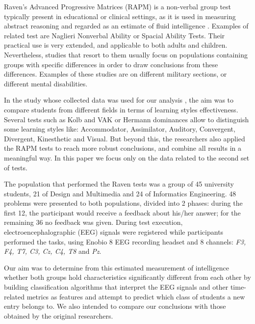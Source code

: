 \documentclass[extendedabs]{recpad2k}
\begin{document}
Raven's Advanced Progressive Matrices (RAPM) is a non-verbal group test typically present in educational or clinical settings, as it is used in measuring 
abstract reasoning and regarded as an estimate of fluid intelligence \cite{rapm}.
Examples of related test are Naglieri Nonverbal Ability or Spacial Ability Tests.
Their practical use is very extended, and applicable to both adults and children.
Nevertheless, studies that resort to them usually focus on populations containing groups with specific differences in order to draw conclusions from these differences.
Examples of these studies are on different military sections, or different mental disabilities.

In the study whose collected data was used for our analysis \cite{study}, the aim was to compare students from different fields in terms of learning styles effectiveness.
Several tests such as Kolb and VAK or Hermann dominances allow to distinguish some learning styles like: Accommodator, Assimilator, Auditory, Convergent,
Divergent, Kinesthetic and Visual.
But beyond this, the researchers also applied the RAPM tests to reach more robust conclusions, and combine all results in a meaningful way.
In this paper we focus only on the data related to the second set of tests.

The population that performed the Raven tests was a group of 45 university students, 21 of Design and Multimedia and 24 of Informatics Engineering.
48 problems were presented to both populations, divided into 2 phases: during the first 12, the participant would receive a feedback about his/her answer; 
for the remaining 36 no feedback was given.
During test execution, electroencephalographic (EEG) signals were registered while participants performed the tasks, using Enobio 8 EEG recording headset and 8 
channels: \textit{F3, F4, T7, C3, Cz, C4, T8} and \textit{Pz}.

Our aim was to determine from this estimated measurement of intelligence whether both groups hold characteristics significantly different from each other by 
building classification algorithms that interpret the EEG signals and other time-related metrics as features and attempt to predict which class of students a 
new entry belongs to.
We also intended to compare our conclusions with those obtained by the original researchers.

\end{document}
